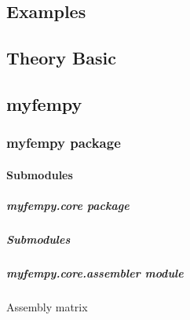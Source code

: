 \documentclass[letterpaper,10pt,english]{sphinxmanual}
\begin{document}
\sphinxstepscope


\subsection{Examples}
\label{\detokenize{examples:examples}}\label{\detokenize{examples::doc}}
\sphinxstepscope


\subsection{Theory Basic}
\label{\detokenize{theory:theory-basic}}\label{\detokenize{theory::doc}}
\sphinxstepscope


\subsection{myfempy}
\label{\detokenize{modules:myfempy}}\label{\detokenize{modules::doc}}
\sphinxstepscope


\subsubsection{myfempy package}
\label{\detokenize{myfempy:myfempy-package}}\label{\detokenize{myfempy::doc}}

\paragraph{Submodules}
\label{\detokenize{myfempy:submodules}}
\sphinxstepscope


\subparagraph{myfempy.core package}
\label{\detokenize{myfempy.core:myfempy-core-package}}\label{\detokenize{myfempy.core::doc}}

\subparagraph{Submodules}
\label{\detokenize{myfempy.core:submodules}}

\subparagraph{myfempy.core.assembler module}
\label{\detokenize{myfempy.core:module-myfempy.core.assembler}}\label{\detokenize{myfempy.core:myfempy-core-assembler-module}}
\sphinxAtStartPar
Assembly matrix
\end{document}
